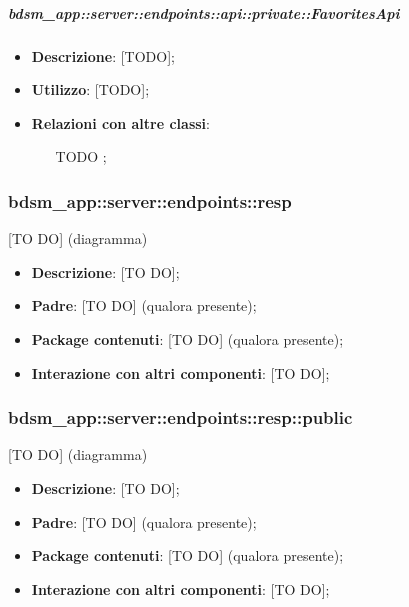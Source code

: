     \subparagraph{bdsm\_app::server::endpoints::api::private::FavoritesApi} %
    \label{subp:bdsm_app_server_endpoints_api_private_favoritesapi}
    \begin{itemize}
      \item \textbf{Descrizione}: [TODO];
      \item \textbf{Utilizzo}: [TODO];
      \item \textbf{Relazioni con altre classi}:
        \begin{itemize}
          \item [TODO];
        \end{itemize}
      \end{itemize}

\subsubsection{bdsm\_app::server::endpoints::resp} %
\label{ssub:bdsm_app_server_endpoints_resp}
[TO DO] (diagramma) \newline \newline

\begin{itemize}
  \item \textbf{Descrizione}: [TO DO];
  \item \textbf{Padre}: [TO DO] (qualora presente);
  \item \textbf{Package contenuti}: [TO DO] (qualora presente);
  \item \textbf{Interazione con altri componenti}: [TO DO];
\end{itemize}

\subsubsection{bdsm\_app::server::endpoints::resp::public} %
\label{ssub:bdsm_app_server_endpoints_resp_public}
[TO DO] (diagramma) \newline \newline

\begin{itemize}
  \item \textbf{Descrizione}: [TO DO];
  \item \textbf{Padre}: [TO DO] (qualora presente);
  \item \textbf{Package contenuti}: [TO DO] (qualora presente);
  \item \textbf{Interazione con altri componenti}: [TO DO];
\end{itemize}

